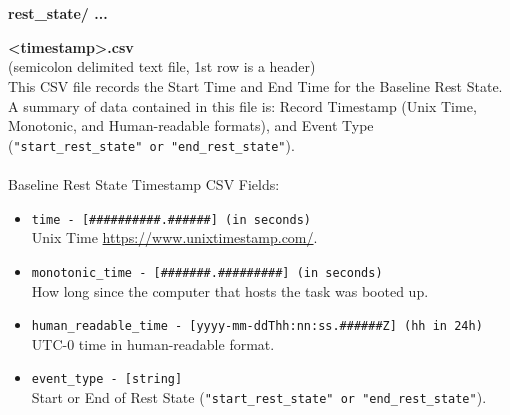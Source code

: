 \begin{description}
\begin{addmargin}[0em]{0em}
    \end{addmargin} %


    \textbf{\\\\}
    \begin{addmargin}[0em]{0em} %
        \textbf{rest\_state/ ...}

        \begin{addmargin}[1em]{0em} %
            \textbf{<timestamp>.csv}\\(semicolon delimited text file, 1st row is a header)\\
            This CSV file records the Start Time and End Time for the Baseline Rest State.
            A summary of data contained in this file is: Record Timestamp (Unix Time, Monotonic, and Human-readable formats),
            and Event Type (\verb|"start_rest_state" or "end_rest_state"|).\\\\
            Baseline Rest State Timestamp CSV Fields:
            \begin{itemize}
                \item \verb|time - [##########.######] (in seconds)|\\Unix Time \href{https://www.unixtimestamp.com/}{https://www.unixtimestamp.com/}.
                \item \verb|monotonic_time - [#######.#########] (in seconds)|\\How long since the computer that hosts the task was booted up.
                \item \verb|human_readable_time - [yyyy-mm-ddThh:nn:ss.######Z] (hh in 24h)|\\UTC-0 time in human-readable format.
                \item \verb|event_type - [string]|\\Start or End of Rest State (\verb|"start_rest_state" or "end_rest_state"|).
            \end{itemize}
        \end{addmargin} %

    \end{addmargin} %
    




\end{description}
